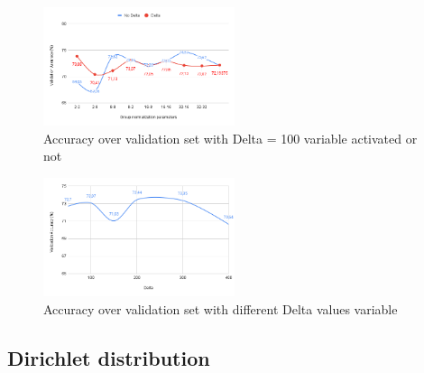 \documentclass[twocolumn]{article}
\begin{document}


\begin{figure}
    \centering
    \includegraphics[width=0.5\textwidth,height=.3\textheight]{groupnormalizationDeltaNoDelta.png}
    \caption{Accuracy over validation set with Delta = 100 variable activated or not}
     \label{AccDiff} 
\end{figure}

\begin{figure}
    \centering
    \includegraphics[width=0.5\textwidth,height=.3\textheight]{deltacomparison.png}
    \caption{Accuracy over validation set with different Delta values variable}
     \label{DeltaValues} 
\end{figure}

\subsection{Dirichlet distribution}
\end{document}

